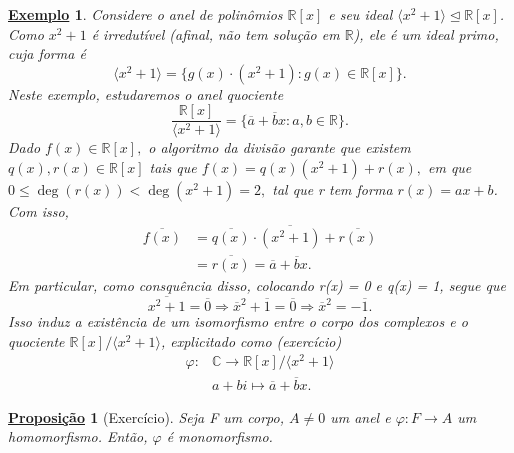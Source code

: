 \documentclass{article}
\newtheorem*{prop*}{\underline{Proposi\c c\~ao}}
\newtheorem{example}{\underline{Exemplo}}
\begin{document}
\begin{example}
  Considere o anel de polinômios \(\mathbb{R}[x]\) e seu ideal \(\langle x^{2}+1 \rangle\trianglelefteq \mathbb{R}[x]\).
  Como \(x^{2}+1\) é irredutível (afinal, não tem solução em \(\mathbb{R}\)), ele é um ideal primo, cuja forma é 
  \[
    \langle x^{2}+1 \rangle = \{g(x)\cdot (x^{2}+1):g(x)\in \mathbb{R}[x]\}.
  \]
  Neste exemplo, estudaremos o anel quociente 
  \[
    \frac{\mathbb{R}[x]}{\langle x^{2}+1 \rangle} = \{\overline{a} + \overline{b}x: a, b\in \mathbb{R}\}.
  \]
  Dado \(f(x)\in \mathbb{R}[x],\) o algoritmo da divisão garante que existem \(q(x), r(x)\in \mathbb{R}[x]\) tais que 
  \(f(x) = q(x)(x^{2}+1) + r(x),\) em que \(0 \leq \deg{(r(x))} < \deg{(x^{2}+1)} = 2,\) tal que r tem forma \(r(x) = ax + b\).
  Com isso, 
  \begin{align*}
    \overline{f(x)} &= \overline{q(x)}\cdot \overline{(x^{2}+1)} + \overline{r(x)}\\
                    &= \overline{r(x)} = \overline{a}+\overline{b}x.
  \end{align*}
  Em particular, como consquência disso, colocando r(x) = 0 e q(x) = 1, segue que 
  \[
    \overline{x^{2}+1} = \overline{0} \Rightarrow \overline{x}^{2} + \overline{1} = \overline{0} \Rightarrow \overline{x}^{2} = -\overline{1}.
  \]
  Isso induz a existência de um isomorfismo entre o corpo dos complexos e o quociente \(\mathbb{R}[x]/\langle x^{2}+1 \rangle\), explicitado como (exercício)
  \begin{align*}
    \varphi :&\mathbb{C}\rightarrow \mathbb{R}[x]/\langle x^{2}+1 \rangle\\
             &a + bi\mapsto \overline{a} + \overline{b}x.
  \end{align*}
\end{example}
\begin{prop*}[Exercício]
  Seja F um corpo, \(A\neq 0\) um anel e \(\varphi : F\rightarrow A\) um homomorfismo. Então, \(\varphi \) é monomorfismo.
\end{prop*}
\end{document}
